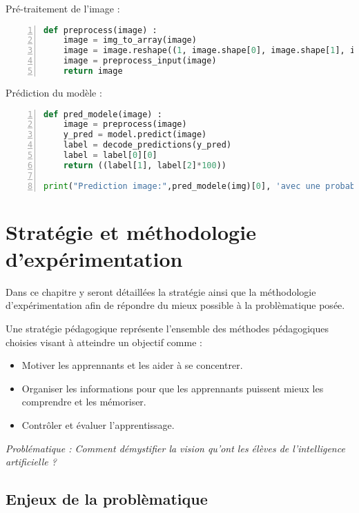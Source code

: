 \documentclass[
12pt,
french,
]{article}
\begin{document}
Pré-traitement de l'image :

\begin{lstlisting}[language=Python, numbers=left, caption={Pre traitement}]
def preprocess(image) :
    image = img_to_array(image)
    image = image.reshape((1, image.shape[0], image.shape[1], image.shape[2]))
    image = preprocess_input(image)
    return image
\end{lstlisting}

Prédiction du modèle :

\begin{lstlisting}[language=Python, numbers=left, caption={Prediction du modele}]
def pred_modele(image) :
    image = preprocess(image)
    y_pred = model.predict(image)
    label = decode_predictions(y_pred)
    label = label[0][0]
    return ((label[1], label[2]*100))

print("Prediction image:",pred_modele(img)[0], 'avec une probabilite de',pred_modele(img)[1])
\end{lstlisting}

\hypertarget{stratuxe9gie-et-muxe9thodologie-dexpuxe9rimentation}{%
\section{Stratégie et méthodologie
d'expérimentation}\label{stratuxe9gie-et-muxe9thodologie-dexpuxe9rimentation}}

Dans ce chapitre y seront détaillées la stratégie ainsi que la
méthodologie d'expérimentation afin de répondre du mieux possible à la
problèmatique posée.

Une stratégie pédagogique représente l'ensemble des méthodes
pédagogiques choisies visant à atteindre un objectif comme :

\begin{itemize}
\item
  Motiver les apprennants et les aider à se concentrer.
\item
  Organiser les informations pour que les apprennants puissent mieux les
  comprendre et les mémoriser.
\item
  Contrôler et évaluer l'apprentissage.
\end{itemize}

\emph{Problématique : Comment démystifier la vision qu'ont les élèves de
l'intelligence artificielle ?}

\hypertarget{enjeux-de-la-probluxe8matique}{%
\subsection{Enjeux de la
problèmatique}\label{enjeux-de-la-probluxe8matique}}
\end{document}
